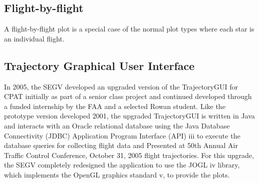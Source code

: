 \documentclass[]{article}
\begin{document}
\subsection{Flight-by-flight}
\label{flightByFlight}
A flight-by-flight plot is a special case of the normal plot types where each star is an individual flight.

\subsection{Trajectory Graphical User Interface}
\label{trajGUI}
In 2005, the SEGV developed an upgraded version of the TrajectoryGUI for CPAT initially as part of a senior class project and continued developed through a funded internship by the FAA and a selected Rowan student. Like the prototype version developed 2001, the upgraded TrajectoryGUI is written in Java and interacts with an Oracle relational database using the Java Database Connectivity (JDBC) Application Program Interface (API) iii to execute the database queries for collecting flight data and Presented at 50th Annual Air Traffic Control Conference, October 31, 2005 flight trajectories. For this upgrade, the SEGV completely redesigned the application to use the JOGL iv library, which implements the OpenGL graphics standard v, to provide the plots.
\end{document}
